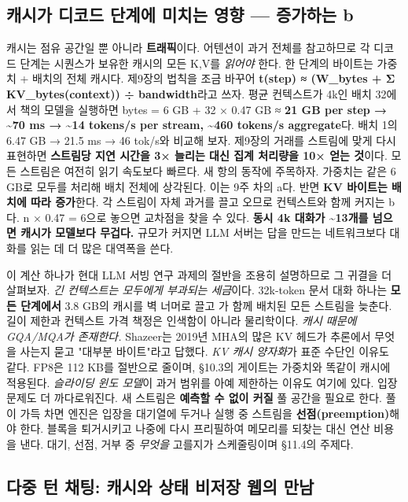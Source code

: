 \subsection*{캐시가 디코드 단계에 미치는 영향 — 증가하는 b}

캐시는 점유 공간일 뿐 아니라 \textbf{트래픽}이다. 어텐션이 과거 전체를 참고하므로 각 디코드 단계는 시퀀스가 보유한 캐시의 모든 K,V를 \textit{읽어야} 한다. 한 단계의 바이트는 가중치 + 배치의 전체 캐시다. 제9장의 법칙을 조금 바꾸어 \textbf{t(step) ≈ (W\_bytes + Σ KV\_bytes(context)) ÷ bandwidth}라고 쓰자. 평균 컨텍스트가 4k인 배치 32에서 책의 모델을 실행하면 bytes = 6 GB + 32 × 0.47 GB ≈ \textbf{21 GB per step → \textasciitilde{}70 ms → \textasciitilde{}14 tokens/s per stream, \textasciitilde{}460 tokens/s aggregate}다. 배치 1의 6.47 GB → 21.5 ms → 46 tok/s와 비교해 보자. 제9장의 거래를 스트림에 맞게 다시 표현하면 \textbf{스트림당 지연 시간을 3× 늘리는 대신 집계 처리량을 10× 얻는 것}이다. 모든 스트림은 여전히 읽기 속도보다 빠르다. 새 항의 동작에 주목하자. 가중치는 같은 6 GB로 모두를 처리해 배치 전체에 상각된다. 이는 9주 차의 a다. 반면 \textbf{KV 바이트는 배치에 따라 증가}한다. 각 스트림이 자체 과거를 끌고 오므로 컨텍스트와 함께 커지는 b다. n × 0.47 = 6으로 놓으면 교차점을 찾을 수 있다. \textbf{동시 4k 대화가 \textasciitilde{}13개를 넘으면 캐시가 모델보다 무겁다.} 규모가 커지면 LLM 서버는 답을 만드는 네트워크보다 대화를 읽는 데 더 많은 대역폭을 쓴다.

이 계산 하나가 현대 LLM 서빙 연구 과제의 절반을 조용히 설명하므로 그 귀결을 더 살펴보자. \textit{긴 컨텍스트는 모두에게 부과되는 세금}이다. 32k-token 문서 대화 하나는 \textbf{모든 단계에서} 3.8 GB의 캐시를 벽 너머로 끌고 가 함께 배치된 모든 스트림을 늦춘다. 길이 제한과 컨텍스트 가격 책정은 인색함이 아니라 물리학이다. \textit{캐시 때문에 GQA/MQA가 존재한다.} Shazeer는 2019년 MHA의 많은 KV 헤드가 추론에서 무엇을 사는지 묻고 "대부분 바이트"라고 답했다. \textit{KV 캐시 양자화}가 표준 수단인 이유도 같다. FP8은 112 KB를 절반으로 줄이며, §10.3의 게이트는 가중치와 똑같이 캐시에 적용된다. \textit{슬라이딩 윈도 모델}이 과거 범위를 아예 제한하는 이유도 여기에 있다. 입장 문제도 더 까다로워진다. 새 스트림은 \textbf{예측할 수 없이 커질} 풀 공간을 필요로 한다. 풀이 가득 차면 엔진은 입장을 대기열에 두거나 실행 중 스트림을 \textbf{선점(preemption)}해야 한다. 블록을 퇴거시키고 나중에 다시 프리필하여 메모리를 되찾는 대신 연산 비용을 낸다. 대기, 선점, 거부 중 \textit{무엇을} 고를지가 스케줄링이며 §11.4의 주제다.

\subsection*{다중 턴 채팅: 캐시와 상태 비저장 웹의 만남}

